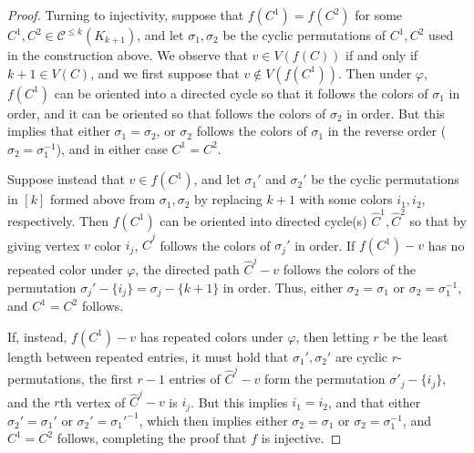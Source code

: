 \documentclass[12pt]{article}
\numberwithin{theorem}{section}
\begin{document}
\begin{proof}
    Turning to injectivity, suppose that $f(C^1)=f(C^2)$ for some $C^1, C^2 \in \mathcal{C}^{\le k}(K_{k+1})$, and let $\sigma_1,\sigma_2$ be the cyclic permutations of $C^1,C^2$ used in the construction above.  We observe that $v \in V(f(C))$ if and only if $k+1 \in V(C)$, and we first suppose that $v \notin V(f(C^1))$.  Then under $\varphi$, $f(C^1)$ can be oriented into a directed cycle so that it follows the colors of $\sigma_1$ in order, and it can be oriented so that follows the colors of $\sigma_2$ in order.  But this implies that either $\sigma_1=\sigma_2$, or $\sigma_2$ follows the colors of $\sigma_1$ in the reverse order ($\sigma_2=\sigma_1^{-1}$), and in either case $C^1=C^2$.

    Suppose instead that $v \in f(C^1)$, and let $\sigma_1'$ and $\sigma_2'$ be the cyclic permutations in $[k]$ formed above from $\sigma_1,\sigma_2$ by replacing $k+1$ with some colors $i_1,i_2$, respectively. Then $f(C^1)$ can be oriented into directed cycle(s) $\widehat{C}^1,\widehat{C}^2$ so that by giving vertex $v$ color $i_j$, $\widehat{C}^j$ follows the colors of $\sigma_j'$ in order. If $f(C^1)-v$ has no repeated color under $\varphi$, the directed path $\widehat{C}^j-v$ follows the colors of the permutation $\sigma_j'-\{i_j\}=\sigma_j-\{k+1\}$ in order.  Thus, either $\sigma_2=\sigma_1$ or $\sigma_2=\sigma_1^{-1}$, and $C^1=C^2$ follows.

    If, instead, $f(C^1)-v$ has repeated colors under $\varphi$, then letting $r$ be the least length between repeated entries, it must hold that $\sigma_1',\sigma_2'$ are cyclic $r$-permutations, the first $r-1$ entries of $\widehat{C}^j-v$ form the permutation $\sigma'_j-\{i_j\}$, and  the $r$th vertex of $\widehat{C}^j-v$ is $i_j$.  But this implies $i_1=i_2$, and that either $\sigma_2'=\sigma_1'$ or $\sigma_2'=\sigma_1'^{-1}$, which then implies either $\sigma_2=\sigma_1$ or $\sigma_2=\sigma_1^{-1}$, and $C^1=C^2$ follows, completing the proof that $f$ is injective.
\end{proof}
\end{document}
